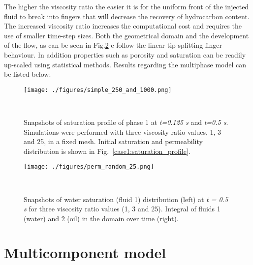 \documentclass[12pt,a4paper,oneside]{report}%
\begin{document}
The higher the viscosity ratio the easier it is for the uniform front of the injected fluid to break into fingers that will decrease the recovery of hydrocarbon content. The increased viscosity ratio increases the computational cost and requires the use of smaller time-step sizes. Both the geometrical domain and the development of the flow, as can be seen in Fig.\ref{case2:random_simulation}-c follow the linear tip-splitting finger behaviour. In addition properties such as porosity and saturation can be readily up-scaled using statistical methods.
Results regarding the multiphase model can be listed below: 

\begin{figure}[h]
\centering
\texttt{[image: ./figures/simple\_250\_and\_1000.png]}
\caption{Snapshots of saturation profile of phase 1 at {\it t=0.125 s} and {\it t=0.5 s}. Simulations were performed with three viscosity ratio values, 1, 3 and 25, in a fixed mesh. Initial saturation and permeability distribution is shown in Fig.~\ref{case1:saturation_profile}.}~\label{case1:simple_profile}
\end{figure}

\begin{figure}[h]
\centering
\texttt{[image: ./figures/perm\_random\_25.png]}
\caption{Snapshots of water saturation (fluid 1) distribution (left) at {\it t = 0.5  s} for three viscosity ratio values (1, 3 and 25). Integral of fluids 1 (water) and 2 (oil) in the domain over time (right).}~\label{case2:random_simulation}
\end{figure}


\pagebreak


\section{Multicomponent model}
\end{document}
